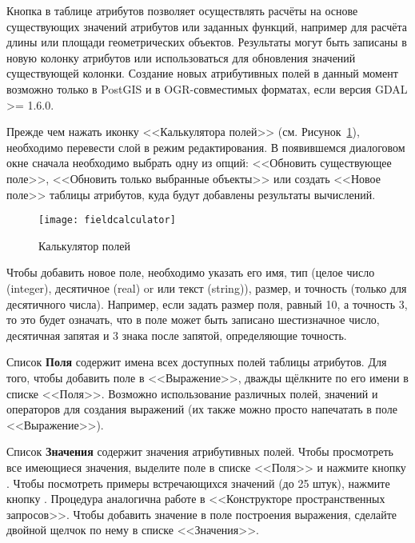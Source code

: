Кнопка  в
таблице атрибутов позволяет осуществлять расчёты на основе существующих
значений атрибутов или заданных функций, например для расчёта длины или
площади геометрических объектов. Результаты могут быть записаны в новую
колонку атрибутов или использоваться для обновления значений существующей
колонки. Создание новых атрибутивных полей в данный момент возможно только
в PostGIS и в OGR-совместимых форматах, если версия GDAL >= 1.6.0.

Прежде чем нажать иконку <<Калькулятора полей>> (см. Рисунок~\ref{fig:field_calculator}),
необходимо перевести слой в режим редактирования. В появившемся диалоговом
окне сначала необходимо выбрать одну из опций: <<Обновить существующее поле>>,
<<Обновить только выбранные объекты>> или создать <<Новое поле>> таблицы
атрибутов, куда будут добавлены результаты вычислений.

\begin{figure}[ht]
  \centering
    \texttt{[image: fieldcalculator]}
    \caption{Калькулятор полей \wincaption}\label{fig:field_calculator}
\end{figure}

Чтобы добавить новое поле, необходимо указать его имя, тип (целое число
(integer), десятичное (real) or или текст (string)), размер, и точность
(только для десятичного числа). Например, если задать размер поля, равный
10, а точность 3, то это будет означать, что в поле может быть записано
шестизначное число, десятичная запятая и 3 знака после запятой, определяющие
точность.

Список \textbf{Поля} содержит имена всех доступных полей таблицы атрибутов.
Для того, чтобы добавить поле в <<Выражение>>, дважды щёлкните по его имени
в списке <<Поля>>. Возможно использование различных полей, значений и
операторов для создания выражений (их также можно просто напечатать в
поле <<Выражение>>).

Список \textbf{Значения} содержит значения атрибутивных полей. Чтобы
просмотреть все имеющиеся значения, выделите поле в списке <<Поля>> и
нажмите кнопку  .
Чтобы посмотреть примеры встречающихся значений (до 25 штук), нажмите
кнопку  .
Процедура аналогична работе в <<Конструкторе пространственных запросов>>.
Чтобы добавить значение в поле построения выражения, сделайте двойной
щелчок по нему в списке <<Значения>>.

